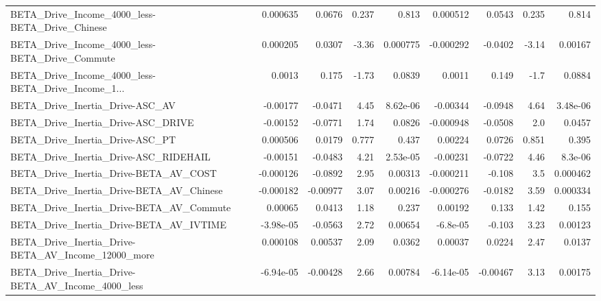 \begin{tabular}{lrrrrrrrr}
BETA\_Drive\_Income\_4000\_less-BETA\_Drive\_Chinese     &    0.000635 &       0.0676 &    0.237 &    0.813 &   0.000512 &      0.0543 &        0.235 &         0.814 \\
BETA\_Drive\_Income\_4000\_less-BETA\_Drive\_Commute     &    0.000205 &       0.0307 &    -3.36 & 0.000775 &  -0.000292 &     -0.0402 &        -3.14 &       0.00167 \\
BETA\_Drive\_Income\_4000\_less-BETA\_Drive\_Income\_1... &      0.0013 &        0.175 &    -1.73 &   0.0839 &     0.0011 &       0.149 &         -1.7 &        0.0884 \\
BETA\_Drive\_Inertia\_Drive-ASC\_AV                    &    -0.00177 &      -0.0471 &     4.45 & 8.62e-06 &   -0.00344 &     -0.0948 &         4.64 &      3.48e-06 \\
BETA\_Drive\_Inertia\_Drive-ASC\_DRIVE                 &    -0.00152 &      -0.0771 &     1.74 &   0.0826 &  -0.000948 &     -0.0508 &          2.0 &        0.0457 \\
BETA\_Drive\_Inertia\_Drive-ASC\_PT                    &    0.000506 &       0.0179 &    0.777 &    0.437 &    0.00224 &      0.0726 &        0.851 &         0.395 \\
BETA\_Drive\_Inertia\_Drive-ASC\_RIDEHAIL              &    -0.00151 &      -0.0483 &     4.21 & 2.53e-05 &   -0.00231 &     -0.0722 &         4.46 &       8.3e-06 \\
BETA\_Drive\_Inertia\_Drive-BETA\_AV\_COST              &   -0.000126 &      -0.0892 &     2.95 &  0.00313 &  -0.000211 &      -0.108 &          3.5 &      0.000462 \\
BETA\_Drive\_Inertia\_Drive-BETA\_AV\_Chinese           &   -0.000182 &     -0.00977 &     3.07 &  0.00216 &  -0.000276 &     -0.0182 &         3.59 &      0.000334 \\
BETA\_Drive\_Inertia\_Drive-BETA\_AV\_Commute           &     0.00065 &       0.0413 &     1.18 &    0.237 &    0.00192 &       0.133 &         1.42 &         0.155 \\
BETA\_Drive\_Inertia\_Drive-BETA\_AV\_IVTIME            &   -3.98e-05 &      -0.0563 &     2.72 &  0.00654 &   -6.8e-05 &      -0.103 &         3.23 &       0.00123 \\
BETA\_Drive\_Inertia\_Drive-BETA\_AV\_Income\_12000\_more &    0.000108 &      0.00537 &     2.09 &   0.0362 &    0.00037 &      0.0224 &         2.47 &        0.0137 \\
BETA\_Drive\_Inertia\_Drive-BETA\_AV\_Income\_4000\_less  &   -6.94e-05 &     -0.00428 &     2.66 &  0.00784 &  -6.14e-05 &    -0.00467 &         3.13 &       0.00175 \\

\end{tabular}
